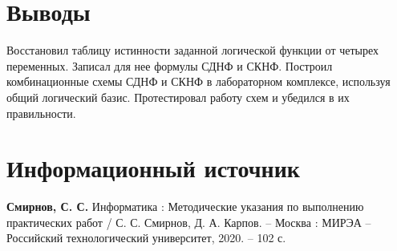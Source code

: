 \documentclass[14pt, a4paper]{extreport}
\begin{document}
\makeatletter
\setlength{\@fptop}{0pt}
\makeatother

\chapter{Выводы}
Восстановил таблицу истинности заданной логической функции от четырех переменных. Записал для нее формулы СДНФ и СКНФ. Построил комбинационные схемы СДНФ и СКНФ в лабораторном комплексе, используя общий логический базис. Протестировал работу схем и убедился в их правильности.

\chapter{Информационный источник}
\textbf{Смирнов, С. С.} Информатика : Методические указания по выполнению практических работ / С. С. Смирнов, Д. А. Карпов. -- Москва : МИРЭА -- Российский технологический университет, 2020. -- 102 с.
\end{document}
